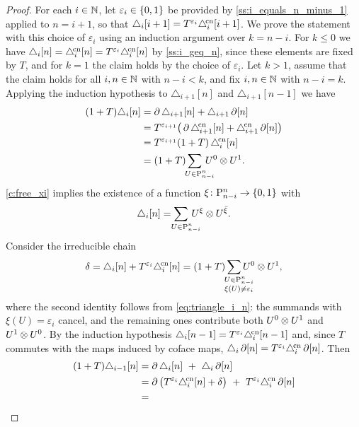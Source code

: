 \begin{proof}
	For each $i \in \mathbb{N}$, let $\varepsilon_i \in \{0,1\}$ be provided by \cref{ss:i_equals_n_minus_1} applied to $n = i+1$, so that $\triangle_i[i+1] = T^{\varepsilon_i}\triangle^{\!\mathrm{cn}}_i[i+1]$.
	We prove the statement with this choice of $\varepsilon_i$ using an induction argument over $k = n-i$.
	For $k \leq 0$ we have $\triangle_i [n] = \triangle^{\!\mathrm{cn}}_ i [n] = T^{\varepsilon_i}\triangle^{\!\mathrm{cn}}_ i [n]$ by \cref{ss:i_geq_n}, since these elements are fixed by $T$, and for $k = 1$ the claim holds by the choice of $\varepsilon_i$.
	Let $k > 1$, assume that the claim holds for all $i,n \in \mathbb{N}$ with $n-i < k$, and fix $i,n \in \mathbb{N}$ with $n-i = k$.
	Applying the induction hypothesis to $\triangle_{i+1}[n]$ and $\triangle_{i+1}[n-1]$ we have
	\begin{align*}
		(1+T)\triangle_i[n] &=
		\bd\triangle_{i+1}[n] + \triangle_{i+1}\bd[n] \\ &=
		T^{\varepsilon_{i+1}} \big( \bd\canonical_{i+1}[n] + \canonical_{i+1}\bd[n] \big) \\ &=
		T^{\varepsilon_{i+1}} (1+T)\,\canonical_i[n] \\ &=
		(1+T)\sum_{\mathclap{\quad U \in \P_{n-i}^n}} \, U^0 \ot U^1.
	\end{align*}
	\cref{c:free_xi} implies the existence of a function $\xi \colon \mathrm{P}_{n-i}^n \to \{0,1\}$ with
	\begin{equation}\label{eq:triangle_i_n}
		\triangle_i[n] = \sum_{\mathclap{\quad U \in \P_{n-i}^n}} \, U^{\xi} \ot U^{\barxi}.
	\end{equation}
	Consider the irreducible chain
	\[
	\delta = \triangle_i[n] + T^{\varepsilon_i}\canonical_i[n] =
	(1+T) \sum_{\quad\mathclap{\substack{U \in \P_{n-i}^n \\ \xi(U) \neq \varepsilon_i}}} U^0 \ot U^1,
	\]
	where the second identity follows from \cref{eq:triangle_i_n}: the summands with $\xi(U) = \varepsilon_i$ cancel, and the remaining ones contribute both $U^0 \otimes U^1$ and $U^1 \otimes U^0$.
	By the induction hypothesis $\triangle_i[n-1] = T^{\varepsilon_i}\triangle^{\!\mathrm{cn}}_i[n-1]$ and, since $T$ commutes with the maps induced by coface maps, $\triangle_{i}\operatorname{\partial}[n] = T^{\varepsilon_i}\triangle^{\!\mathrm{cn}}_{i}\operatorname{\partial}[n]$.
	Then
	\begin{equation}\label{eq:main proof a}
		\begin{split}
			(1+T)\triangle_{i-1}[n] &=
			\bd \triangle_{i}[n] \ +\ \triangle_{i}\bd[n] \\ &=
			\bd \big( T^{\varepsilon_i}\canonical_{i}[n] + \delta \big)
			\ +\ T^{\varepsilon_i}\canonical_{i}\bd[n] \\ &=

\end{split}
\end{equation}
\end{proof}
